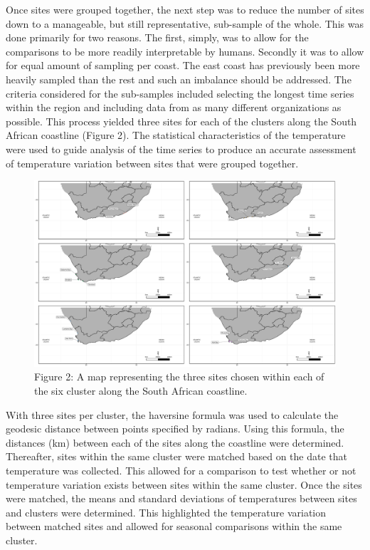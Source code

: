 \documentclass[12pt,]{article}
\begin{document}
Once sites were grouped together, the next step was to reduce the number
of sites down to a manageable, but still representative, sub-sample of
the whole. This was done primarily for two reasons. The first, simply,
was to allow for the comparisons to be more readily interpretable by
humans. Secondly it was to allow for equal amount of sampling per coast.
The east coast has previously been more heavily sampled than the rest
and such an imbalance should be addressed. The criteria considered for
the sub-samples included selecting the longest time series within the
region and including data from as many different organizations as
possible. This process yielded three sites for each of the clusters
along the South African coastline (Figure 2). The statistical
characteristics of the temperature were used to guide analysis of the
time series to produce an accurate assessment of temperature variation
between sites that were grouped together.

\begin{figure}
\centering
\includegraphics{figures/final_combined_plot.pdf}
\caption{Figure 2: A map representing the three sites chosen within each
of the six cluster along the South African coastline.}
\end{figure}

With three sites per cluster, the haversine formula was used to
calculate the geodesic distance between points specified by radians.
Using this formula, the distances (km) between each of the sites along
the coastline were determined. Thereafter, sites within the same cluster
were matched based on the date that temperature was collected. This
allowed for a comparison to test whether or not temperature variation
exists between sites within the same cluster. Once the sites were
matched, the means and standard deviations of temperatures between sites
and clusters were determined. This highlighted the temperature variation
between matched sites and allowed for seasonal comparisons within the
same cluster.
\end{document}

